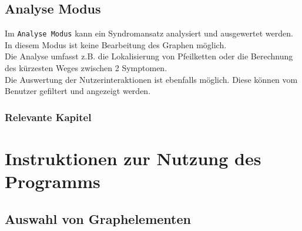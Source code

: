 \documentclass[enabledeprecatedfontcommands,fontsize=11pt,paper=a4,twoside]{scrartcl}
\newcounter{one}
\newcounter{two}[one]
\let\tempone\itemize
\let\temptwo\enditemize
\renewenvironment{itemize}{\tempone\addtolength{\itemsep}{-10.0pt}}{\temptwo}
\begin{document}
\subsection{Analyse Modus}
Im \texttt{Analyse Modus} kann ein Syndromansatz analysiert und ausgewertet werden. In diesem Modus ist keine Bearbeitung des Graphen möglich. \\
Die Analyse umfasst z.B. die Lokalisierung von Pfeilketten oder die Berechnung des kürzesten Weges zwischen 2 Symptomen. \\
Die Auswertung der Nutzerinteraktionen ist ebenfalls möglich. Diese können vom Benutzer gefiltert und angezeigt werden. 
\subsubsection{Relevante Kapitel}
\begin{itemize}
	\item {}	
	\item {}
	\item {}
	\item {}
	\item {}
	\item {}
	\item {}
	\item {}
	\item {}
	\item {}	
	\item {}
\end{itemize}


\newpage
\section{Instruktionen zur Nutzung des Programms} \label{sec:nutzung}

		\subsection{Auswahl von Graphelementen} \label{pick}
\end{document}
